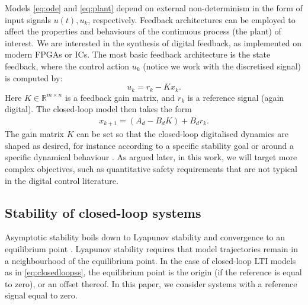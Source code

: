 \documentclass[runningheads,a4paper]{llncs}
\newcommand{\addtodo}[1]{{\color{red} TODO: #1}}
\begin{document}
Models \eqref{eq:ode} and \eqref{eq:plant} depend on external non-determinism in the form of input signals $u (t), u_k$, respectively. 
Feedback architectures can be employed to affect the properties and behaviours of the continuous process (the plant) of interest.   
We are interested in the synthesis of digital feedback, 
as implemented on modern FPGAs or ICs. 
The most basic feedback architecture is the state feedback, 
where the control action $u_k$ (notice we work with the discretised signal) is computed by: 
%
\begin{equation}
\label{eq:controlaction}
u_k = r_{k} - K x_k. 
\end{equation}
%
Here $K \in \mathbb{R}^{m \times n}$ is a feedback gain matrix, 
and $r_{k}$ is a reference signal (again digital).   
%
The closed-loop model then takes the form 
\begin{align}
\label{eq:closedloopss}
x_{k+1} = ( A_d - B_d K ) + B_d r_k.
\end{align}
The gain matrix $K$ can be set so that the closed-loop digitalised dynamics are shaped as desired, 
for instance according to a specific stability goal or around a specific dynamical behaviour \cite{astrom1997computer}. 
As argued later, in this work, we will target more complex objectives, such as quantitative safety requirements that are not typical in the digital control literature. 

\subsection{Stability of closed-loop systems}
\label{ssec:stability}


Asymptotic stability boils down to Lyapunov stability and convergence to an equilibrium point .  
Lyapunov stability requires that model trajectories remain in a neighbourhood of the equilibrium point. 
In the case of closed-loop LTI models as in \eqref{eq:closedloopss}, 
the equilibrium point is the origin (if the reference is equal to zero), or an offset thereof.  
In this paper, we consider systems with a reference signal equal to zero. 
\end{document}
